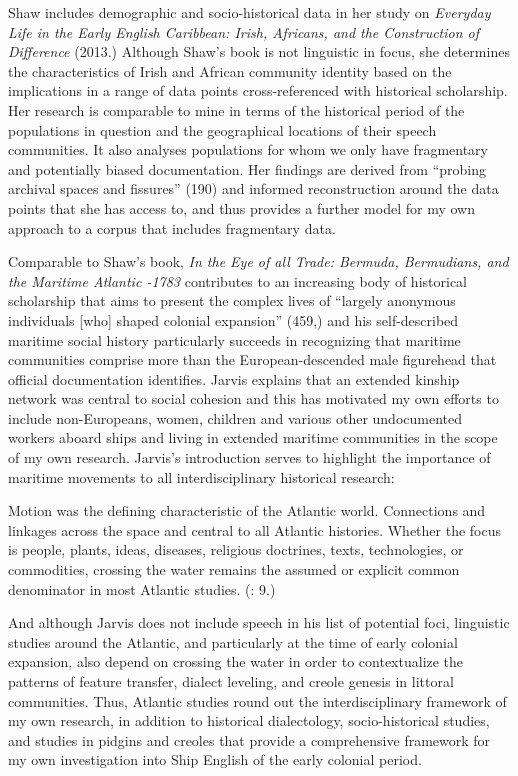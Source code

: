 Shaw includes demographic and socio-historical data in her study on \textit{Everyday Life in the Early English Caribbean: Irish, Africans, and the Construction of Difference} (2013.) Although Shaw’s book is not linguistic in focus, she determines the characteristics of Irish and African community identity based on the implications in a range of data points cross-referenced with historical scholarship. Her research is comparable to mine in terms of the historical period of the populations in question and the geographical locations of their speech communities. It also analyses populations for whom we only have fragmentary and potentially biased documentation. Her findings are derived from “probing archival spaces and fissures” (190) and informed reconstruction around the data points that she has access to, and thus provides a further model for my own approach to a corpus that includes fragmentary data. 

Comparable to Shaw’s book,  \textit{In the Eye of all Trade: Bermuda, Bermudians, and the Maritime Atlantic \citealt{World1680}-1783} contributes to an increasing body of historical scholarship that aims to present the complex lives of “largely anonymous individuals [who] shaped colonial expansion” (459,) and his self-described maritime social history particularly succeeds in recognizing that maritime communities comprise more than the European-descended male figurehead that official documentation identifies. Jarvis explains that an extended kinship network was central to social cohesion and this has motivated my own efforts to include non-Europeans, women, children and various other undocumented workers aboard ships and living in extended maritime communities in the scope of my own research. Jarvis’s introduction serves to highlight the importance of maritime movements to all interdisciplinary historical research: 

Motion was the defining characteristic of the Atlantic world. Connections and linkages across the space and central to all Atlantic histories. Whether the focus is people, plants, ideas, diseases, religious doctrines, texts, technologies, or commodities, crossing the water remains the assumed or explicit common denominator in most Atlantic studies. (\citealt{Jarvis2010}: 9.)

And although Jarvis does not include speech in his list of potential foci, linguistic studies around the Atlantic, and particularly at the time of early colonial expansion, also depend on crossing the water in order to contextualize the patterns of feature transfer, dialect leveling, and creole genesis in littoral communities. Thus, Atlantic studies round out the interdisciplinary framework of my own research, in addition to historical dialectology, socio-historical studies, and studies in pidgins and creoles that provide a comprehensive framework for my own investigation into Ship English of the early colonial period. 

